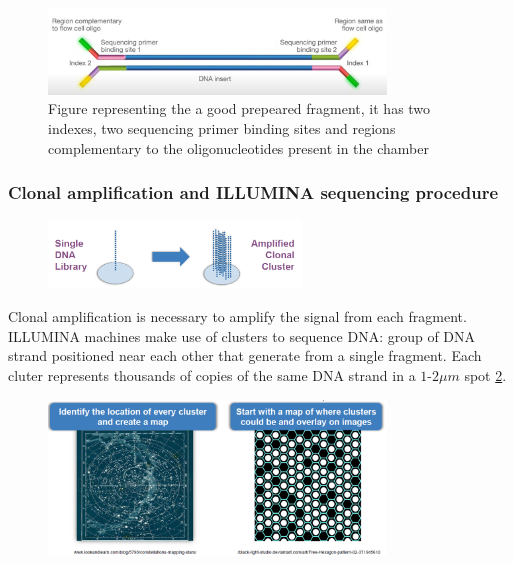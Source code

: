         \begin{figure}[h]
            \centering
            \includegraphics[width=0.8\textwidth]{tagmentedFragments}
            \caption{Figure representing the a good prepeared fragment, it has two indexes, two sequencing primer binding sites and regions complementary to the oligonucleotides present in the chamber}
            \label{}
        \end{figure}

        \subsubsection{Clonal amplification and ILLUMINA sequencing procedure}

        \begin{figure}[h]
            \centering
            \includegraphics[width=0.6\textwidth]{clusterAmplification}
            \caption{}
            \label{clusters}
        \end{figure}

        Clonal amplification is necessary to amplify the signal from each fragment.
        ILLUMINA machines make use of clusters to sequence DNA: group of DNA strand positioned near each other that generate from a single fragment.
        Each cluter represents thousands of copies of the same DNA strand in a $1$-$2\mu m$ spot \ref{clusters}.

        \begin{figure}[h]
            \centering
            \includegraphics[width=0.8\textwidth]{rigidGeneration}
            \caption{}
            \label{rigid}
        \end{figure}

